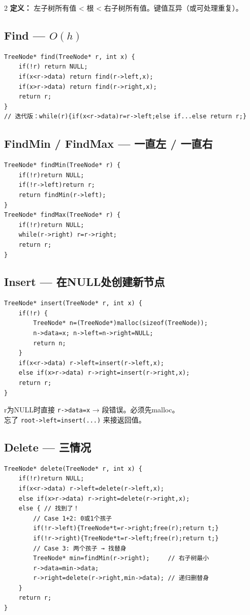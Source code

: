 \documentclass[10pt,a4paper]{article}
\begin{document}
\begin{multicols}{2}
\textbf{定义：} 左子树所有值 < 根 < 右子树所有值。键值互异（或可处理重复）。

\subsection*{Find — $O(h)$}

\begin{lstlisting}
TreeNode* find(TreeNode* r, int x) {
    if(!r) return NULL;
    if(x<r->data) return find(r->left,x);
    if(x>r->data) return find(r->right,x);
    return r;
}
// 迭代版：while(r){if(x<r->data)r=r->left;else if...else return r;}
\end{lstlisting}

\subsection*{FindMin / FindMax — 一直左 / 一直右}

\begin{lstlisting}
TreeNode* findMin(TreeNode* r) {
    if(!r)return NULL;
    if(!r->left)return r;
    return findMin(r->left);
}
TreeNode* findMax(TreeNode* r) {
    if(!r)return NULL;
    while(r->right) r=r->right;
    return r;
}
\end{lstlisting}

\subsection*{Insert — 在NULL处创建新节点}

\begin{lstlisting}
TreeNode* insert(TreeNode* r, int x) {
    if(!r) {
        TreeNode* n=(TreeNode*)malloc(sizeof(TreeNode));
        n->data=x; n->left=n->right=NULL;
        return n;
    }
    if(x<r->data) r->left=insert(r->left,x);
    else if(x>r->data) r->right=insert(r->right,x);
    return r;
}
\end{lstlisting}

\begin{bugbox}
r为NULL时直接 \texttt{r->data=x} → 段错误。必须先malloc。\\
忘了 \texttt{root->left=insert(...)} 来接返回值。
\end{bugbox}

\subsection*{Delete — 三情况}

\begin{lstlisting}
TreeNode* delete(TreeNode* r, int x) {
    if(!r)return NULL;
    if(x<r->data) r->left=delete(r->left,x);
    else if(x>r->data) r->right=delete(r->right,x);
    else { // 找到了！
        // Case 1+2: 0或1个孩子
        if(!r->left){TreeNode*t=r->right;free(r);return t;}
        if(!r->right){TreeNode*t=r->left;free(r);return t;}
        // Case 3: 两个孩子 → 找替身
        TreeNode* min=findMin(r->right);     // 右子树最小
        r->data=min->data;
        r->right=delete(r->right,min->data); // 递归删替身
    }
    return r;
}
\end{lstlisting}


\end{multicols}
\end{document}
